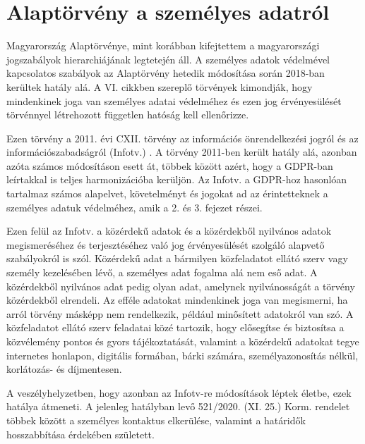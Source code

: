 \section{Alaptörvény a személyes adatról}

Magyarország Alaptörvénye, mint korábban kifejtettem a magyarországi jogszabályok hierarchiájának legtetején áll. A személyes adatok védelmével kapcsolatos szabályok az Alaptörvény hetedik módosítása során 2018-ban kerültek hatály alá. A VI. cikkben szereplő törvények kimondják, hogy mindenkinek joga van személyes adatai védelméhez és ezen jog érvényesülését törvénnyel létrehozott független hatóság kell ellenőrizze. \cite{alaptorveny}

Ezen törvény a 2011. évi CXII. törvény az információs önrendelkezési jogról és az információszabadságról (Infotv.) \cite{2011-CXII-torveny}. A törvény 2011-ben került hatály alá, azonban azóta számos módosításon esett át, többek között azért, hogy a GDPR-ban leírtakkal is teljes harmonizációba kerüljön. Az Infotv. a GDPR-hoz hasonlóan tartalmaz számos alapelvet, követelményt és jogokat ad az érintetteknek a személyes adatuk védelméhez, amik a 2. és 3. fejezet részei.

Ezen felül az Infotv. a közérdekű adatok és a közérdekből nyilvános adatok megismeréséhez és terjesztéséhez való jog érvényesülését szolgáló alapvető szabályokról is szól. Közérdekű adat a bármilyen közfeladatot ellátó szerv vagy személy kezelésében lévő, a személyes adat fogalma alá nem eső adat. A közérdekből nyilvános adat pedig olyan adat, amelynek nyilvánosságát a törvény közérdekből elrendeli. Az efféle adatokat mindenkinek joga van megismerni, ha arról törvény másképp nem rendelkezik, például minősített adatokról van szó. A közfeladatot ellátó szerv feladatai közé tartozik, hogy elősegítse és biztosítsa a közvélemény pontos és gyors tájékoztatását, valamint a közérdekű adatokat  tegye internetes honlapon, digitális formában, bárki számára, személyazonosítás nélkül, korlátozás- és díjmentesen.

A veszélyhelyzetben, hogy azonban az Infotv-re módosítások léptek életbe, ezek hatálya átmeneti. \cite{521/2020} A jelenleg hatályban levő 521/2020. (XI. 25.) Korm. rendelet többek között a személyes kontaktus elkerülése, valamint a határidők hosszabbítása érdekében született.
